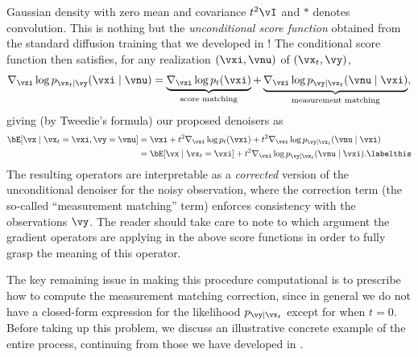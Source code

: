 \documentclass[../../book-main.tex]{subfiles}
\begin{document}
Gaussian density with zero mean and covariance $t^2 \vI$ and $\ast$ denotes
convolution. This is nothing but the \textit{unconditional score function}
obtained from the standard diffusion training that we developed in
!
The conditional score function then satisfies, for any realization $(\vxi,
\vnu)$ of $(\vx_t, \vy)$,
\begin{equation}
  \nabla_{\vxi} \log p_{\vx_t \mid \vy}(\vxi\mid \vnu)
  =
  \underbrace{\nabla_{\vxi} \log p_t(\vxi)}_{\text{score matching}}
  +
  \underbrace{\nabla_{\vxi} \log p_{\vy \mid \vx_t}(\vnu \mid \vxi)}_{\text{measurement matching}},
\end{equation}
giving (by Tweedie's formula) our proposed denoisers as
\begin{align*}
  \bE[ \vx \mid \vx_t=\vxi, \vy=\vnu]
  &=
  \vxi + t^2 \nabla_{\vxi}\log p_t(\vxi) + t^2 \nabla_{\vxi}\log p_{\vy \mid
  \vx_t}(\vnu \mid \vxi)
  \\
  &=
  \bE[\vx \mid \vx_t=\vxi] + t^2 \nabla_{\vxi}\log p_{\vy \mid \vx_t}(\vnu\mid
  \vxi).
  \labelthis \label{eq:posterior-sampling-denoiser-decomposition}
\end{align*}
The resulting operators are interpretable as a \textit{corrected} version of the
unconditional denoiser for the noisy observation, where the correction term (the
so-called ``measurement matching'' term) enforces consistency with the
observations $\vy$. The reader should take care to note to which argument the
gradient operators are applying in the above score functions in order to fully
grasp the meaning of this operator.

The key remaining issue in making this procedure computational is to prescribe
how to compute the measurement matching correction, since in general we do not
have a closed-form
expression for the likelihood $p_{\vy \mid \vx_t}$ except for when $t
= 0$. Before taking up this problem, we discuss an illustrative concrete example
of the entire process, continuing from those we have developed in
.
\end{document}
